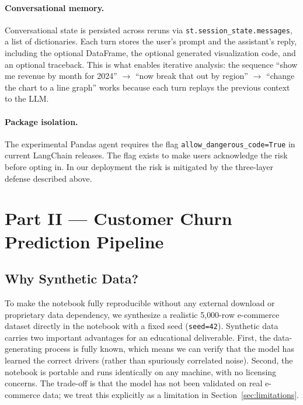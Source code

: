 \documentclass[11pt,a4paper]{article}
\begin{document}
\paragraph{Conversational memory.}
Conversational state is persisted across reruns via
\texttt{st.session\_state.messages}, a list of dictionaries. Each turn
stores the user's prompt and the assistant's reply, including the
optional DataFrame, the optional generated visualization code, and an
optional traceback. This is what enables iterative analysis: the
sequence ``show me revenue by month for 2024'' $\rightarrow$ ``now
break that out by region'' $\rightarrow$ ``change the chart to a line
graph'' works because each turn replays the previous context to the
LLM.

\paragraph{Package isolation.}
The experimental Pandas agent requires the flag
\texttt{allow\_dangerous\_code=True} in current LangChain releases.
The flag exists to make users acknowledge the risk before opting in.
In our deployment the risk is mitigated by the three-layer defense
described above.

\section{Part II --- Customer Churn Prediction Pipeline}

\subsection{Why Synthetic Data?}

To make the notebook fully reproducible without any external download
or proprietary data dependency, we synthesize a realistic 5{,}000-row
e-commerce dataset directly in the notebook with a fixed seed
(\texttt{seed=42}). Synthetic data carries two important advantages
for an educational deliverable. First, the data-generating process is
fully known, which means we can verify that the model has learned the
correct drivers (rather than spuriously correlated noise). Second, the
notebook is portable and runs identically on any machine, with no
licensing concerns. The trade-off is that the model has not been
validated on real e-commerce data; we treat this explicitly as a
limitation in Section~\ref{sec:limitations}.
\end{document}

